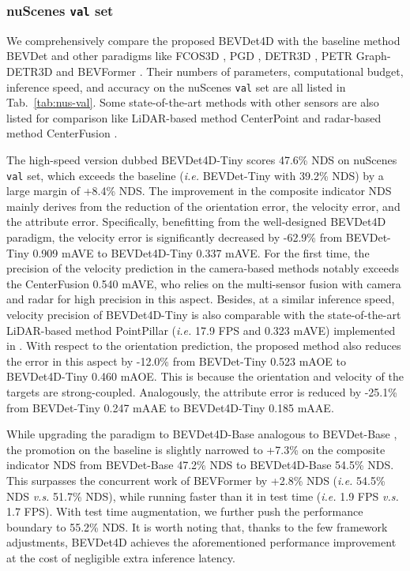 \documentclass[10pt,twocolumn,letterpaper]{article}
\begin{document}
\subsubsection{nuScenes \texttt{val} set}
We comprehensively compare the proposed BEVDet4D with the baseline method BEVDet \cite{BEVDet} and other paradigms like FCOS3D \cite{FCOS3D}, PGD \cite{PGD}, DETR3D \cite{DETR3D}, PETR \cite{PETR} Graph-DETR3D \cite{Graph-DETR3D} and BEVFormer \cite{BEVFormer}. Their numbers of parameters, computational budget, inference speed, and accuracy on the nuScenes \texttt{val} set are all listed in Tab.~\ref{tab:nus-val}. Some state-of-the-art methods with other sensors are also listed for comparison like LiDAR-based method CenterPoint \cite{CenterPoint3D} and radar-based method CenterFusion \cite{Centerfusion}.

The high-speed version dubbed BEVDet4D-Tiny scores 47.6\% NDS on nuScenes \texttt{val} set, which exceeds the baseline (\textit{i.e.} BEVDet-Tiny \cite{BEVDet} with 39.2\% NDS) by a large margin of +8.4\% NDS. The improvement in the composite indicator NDS mainly derives from the reduction of the orientation error, the velocity error, and the attribute error. Specifically, benefitting from the well-designed BEVDet4D paradigm, the velocity error is significantly decreased by -62.9\% from BEVDet-Tiny 0.909 mAVE to BEVDet4D-Tiny 0.337 mAVE. For the first time, the precision of the velocity prediction in the camera-based methods notably exceeds the CenterFusion \cite{Centerfusion} 0.540 mAVE, who relies on the multi-sensor fusion with camera and radar for high precision in this aspect. Besides, at a similar inference speed, velocity precision of BEVDet4D-Tiny is also comparable with the state-of-the-art LiDAR-based method PointPillar \cite{PointPillar} (\textit{i.e.} 17.9 FPS and 0.323 mAVE) implemented in \cite{CenterPoint3D}. With respect to the orientation prediction, the proposed method also reduces the error in this aspect by -12.0\% from BEVDet-Tiny 0.523 mAOE to BEVDet4D-Tiny 0.460 mAOE. This is because the orientation and velocity of the targets are strong-coupled. Analogously, the attribute error is reduced by -25.1\% from BEVDet-Tiny 0.247 mAAE to BEVDet4D-Tiny 0.185 mAAE.

While upgrading the paradigm to BEVDet4D-Base analogous to BEVDet-Base \cite{BEVDet}, the promotion on the baseline is slightly narrowed to +7.3\% on the composite indicator NDS from BEVDet-Base 47.2\% NDS to BEVDet4D-Base 54.5\% NDS. This surpasses the concurrent work of BEVFormer \cite{BEVFormer} by +2.8\% NDS (\textit{i.e.} 54.5\% NDS \textit{v.s.} 51.7\% NDS), while running faster than it in test time (\textit{i.e.} 1.9 FPS \textit{v.s.} 1.7 FPS). With test time augmentation, we further push the performance boundary to 55.2\% NDS. It is worth noting that, thanks to the few framework adjustments, BEVDet4D achieves the aforementioned performance improvement at the cost of negligible extra inference latency.
\end{document}
